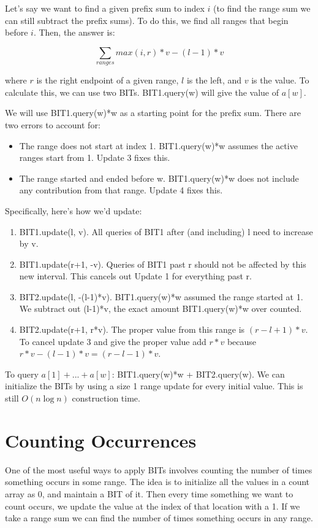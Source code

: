 \documentclass{article}
\begin{document}
        Let's say we want to find a given prefix sum to index $i$ (to find the range sum we can still subtract the prefix sums). To do this, we find all ranges that begin before $i$. Then, the answer is:
        
        $$ \sum_{ranges}{max(i, r)*v-(l-1)*v} $$
        
        where $r$ is the right endpoint of a given range, $l$ is the left, and $v$ is the value.
        To calculate this, we can use two BITs. BIT1.query(w) will give the value of $a[w]$.
        
        We will use BIT1.query(w)*w as a starting point for the prefix sum.  There are two errors to account for:
        \begin{itemize}
            \item The range does not start at index 1. BIT1.query(w)*w assumes the active ranges start from 1. Update 3 fixes this.
            \item The range started and ended before w. BIT1.query(w)*w does not include any contribution from that range. Update 4 fixes this.
        \end{itemize}
        
        Specifically, here's how we'd update:
        \begin{enumerate}
            \item BIT1.update(l, v). All queries of BIT1 after (and including) l need to increase by v.
            \item BIT1.update(r+1, -v). Queries of BIT1 past r should not be affected by this new interval.  This cancels out Update 1 for everything past r.
            \item BIT2.update(l, -(l-1)*v). BIT1.query(w)*w assumed the range started at 1. We subtract out (l-1)*v, the exact amount BIT1.query(w)*w over counted.
            \item BIT2.update(r+1, r*v). The proper value from this range is $(r-l+1)*v$. To cancel update 3 and give the proper value add $r*v$ because $r*v-(l-1)*v=(r-l-1)*v$.
        \end{enumerate}
        
        To query $a[1]+...+a[w]$: BIT1.query(w)*w + BIT2.query(w).
        We can initialize the BITs by using a size 1 range update for every initial value.  This is still $O(n\log n)$ construction time.
            
    \section{Counting Occurrences}
    \noindent One of the most useful ways to apply BITs involves counting the number of times something occurs in some range. The idea is to initialize all the values in a count array as 0, and maintain a BIT of it. Then every time something we want to count occurs, we update the value at the index of that location with a 1. If we take a range sum we can find the number of times something occurs in any range.
    
\end{document}
